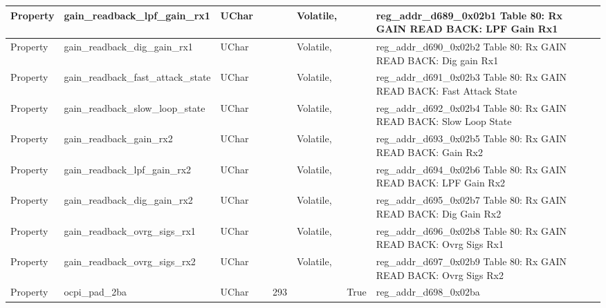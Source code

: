 \documentclass{article}
\begin{document}
\begin{scriptsize}
\begin{longtable}{|p{2cm}|p{5cm}|p{1cm}|p{2cm}|p{2cm}|p{1.75cm}|p{1.5cm}|p{5.1cm}|}
  \hline
  Property & gain\_readback\_lpf\_gain\_rx1                           & UChar &                  &                  & Volatile,           &         & reg\_addr\_d689\_0x02b1 Table 80: Rx GAIN READ BACK: LPF Gain Rx1 \\
  \hline
  Property & gain\_readback\_dig\_gain\_rx1                           & UChar &                  &                  & Volatile,           &         & reg\_addr\_d690\_0x02b2 Table 80: Rx GAIN READ BACK: Dig gain Rx1 \\
  \hline
  Property & gain\_readback\_fast\_attack\_state                      & UChar &                  &                  & Volatile,           &         & reg\_addr\_d691\_0x02b3 Table 80: Rx GAIN READ BACK: Fast Attack State \\
  \hline
  Property & gain\_readback\_slow\_loop\_state                        & UChar &                  &                  & Volatile,           &         & reg\_addr\_d692\_0x02b4 Table 80: Rx GAIN READ BACK: Slow Loop State \\
  \hline
  Property & gain\_readback\_gain\_rx2                                & UChar &                  &                  & Volatile,           &         & reg\_addr\_d693\_0x02b5 Table 80: Rx GAIN READ BACK: Gain Rx2 \\
  \hline
  Property & gain\_readback\_lpf\_gain\_rx2                           & UChar &                  &                  & Volatile,           &         & reg\_addr\_d694\_0x02b6 Table 80: Rx GAIN READ BACK: LPF Gain Rx2 \\
  \hline
  Property & gain\_readback\_dig\_gain\_rx2                           & UChar &                  &                  & Volatile,           &         & reg\_addr\_d695\_0x02b7 Table 80: Rx GAIN READ BACK: Dig Gain Rx2 \\
  \hline
  Property & gain\_readback\_ovrg\_sigs\_rx1                          & UChar &                  &                  & Volatile,           &         & reg\_addr\_d696\_0x02b8 Table 80: Rx GAIN READ BACK: Ovrg Sigs Rx1 \\
  \hline
  Property & gain\_readback\_ovrg\_sigs\_rx2                          & UChar &                  &                  & Volatile,           &         & reg\_addr\_d697\_0x02b9 Table 80: Rx GAIN READ BACK: Ovrg Sigs Rx2 \\
  \hline
  Property & ocpi\_pad\_2ba                                           & UChar &                  & 293              &                     & True    & reg\_addr\_d698\_0x02ba \\

\end{longtable}
\end{scriptsize}
\end{document}
